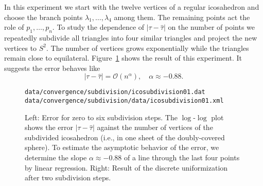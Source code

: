 \documentclass[Thesis]{subfiles}
\begin{document}



In this experiment we start with the twelve vertices of a regular
icosahedron and choose the branch points $\lambda_1,\ldots,\lambda_4$
among them. The remaining points act the role of $p_1,\ldots,p_n$. To study
the dependence of $|\tau-\hat \tau|$ on the number of points we
repeatedly subdivide all triangles into four similar triangles
and project the new vertices to $S^2$. The number of vertices
grows exponentially while the triangles remain close to equilateral.
Figure~\ref{fig:convergence_subdivision} shows the result of this
experiment. It suggests the error behaves like
\begin{equation}
\label{eq:error_ico}
|\tau-\hat \tau|=\mathcal O (n^\alpha),\quad\alpha \approx -0.88.
\end{equation}


\begin{figure}
\centering
{}
{\scriptsize\tt data/convergence/subdivision/icosubdivision01.dat}\\
{\scriptsize\tt data/convergence/subdivision/data/icosubdivision01.xml}
\caption{Left: Error for zero to six subdivision steps. The
  $\log$-$\log$ plot shows the error $|\tau - \hat\tau|$ against the
  number of vertices of the subdivided icosahedron (i.e., in one sheet
  of the doubly-covered sphere). To estimate the asymptotic behavior
  of the error, we determine the slope $\alpha\approx-0.88$ of a line
  through the last four points by linear regression. Right: Result of
  the discrete uniformization after two subdivision steps.}
\label{fig:convergence_subdivision}
\end{figure}
\end{document}
